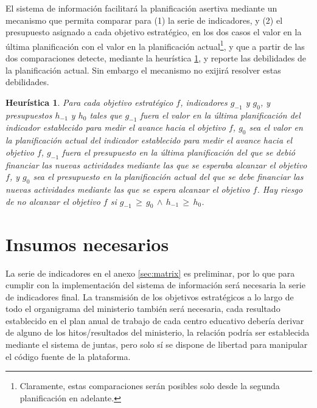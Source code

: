 \documentclass{article}
\newtheorem{heuristic}[theorem]{Heur\'istica}
\begin{document}
\begin{multicols}{6}[]
El sistema de informaci\'on facilitar\'a la planificaci\'on asertiva mediante un mecanismo que permita comparar para (1) la serie de indicadores, y (2) el presupuesto asignado a cada objetivo estrat\'egico, en los dos casos el valor en la \'ultima planificaci\'on con el valor en la planificaci\'on actual\footnote{Claramente, estas comparaciones ser\'an posibles solo desde la segunda planificaci\'on en adelante.}, y que a partir de las dos comparaciones detecte, mediante la heur\'istica \ref{heur}, y reporte las debilidades de la planificaci\'on actual. Sin embargo el mecanismo no exijir\'a resolver estas debilidades.

\begin{heuristic} \label{heur}
 Para cada objetivo estrat\'egico $f$, indicadores $g_{-1}$ y $g_{0}$, y presupuestos $h_{-1}$ y $h_{0}$ tales que $g_{-1}$ fuera el valor en la \'ultima planificaci\'on del indicador establecido para medir el avance hacia el objetivo $f$, $g_{0}$ sea el valor en la planificaci\'on actual del indicador establecido para medir el avance hacia el objetivo $f$, $g_{-1}$ fuera el presupuesto en la \'ultima planificaci\'on del que se debi\'o financiar las nuevas actividades mediante las que se esperaba alcanzar el objetivo $f$, y $g_{0}$ sea el presupuesto en la planificaci\'on actual del que se debe financiar las nuevas actividades mediante las que se espera alcanzar el objetivo $f$. Hay riesgo de no alcanzar el objetivo $f$ si $g_{-1}\,\geq\,g_{0}\,\land\,h_{-1}\,\geq\,h_{0}$.
\end{heuristic}


\section{Insumos necesarios}


La serie de indicadores en el anexo \ref{sec:matrix} es preliminar, por lo que para cumplir con la implementaci\'on del sistema de informaci\'on ser\'a necesaria la serie de indicadores final. La transmisi\'on de los objetivos estrat\'egicos a lo largo de todo el organigrama del ministerio tambi\'en ser\'a necesaria, cada resultado establecido en el plan anual de trabajo de cada centro educativo deber\'ia derivar de alguno de los hitos/resultados del ministerio, la relaci\'on podr\'ia ser establecida mediante el sistema de juntas, pero solo s\'i se dispone de libertad para manipular el c\'odigo fuente de la plataforma.


\end{multicols}
\end{document}
